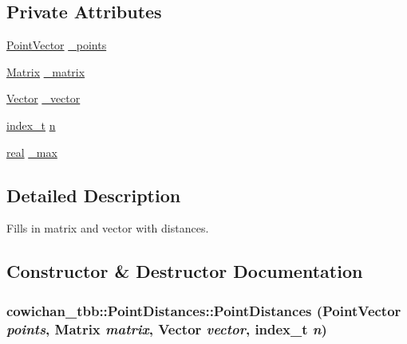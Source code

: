 \subsection*{Private Attributes}
\begin{CompactItemize}
\item 
\hyperlink{class_point}{PointVector} \hyperlink{classcowichan__tbb_1_1_point_distances_98528a38b93f367d6f5da78d4efb7fa7}{\_\-points}
\item 
\hyperlink{cowichan_8hpp_3fb46f939e55c239fbc95656fc0f3399}{Matrix} \hyperlink{classcowichan__tbb_1_1_point_distances_2f52c8fa9b61e6baf83ff17afd01cc14}{\_\-matrix}
\item 
\hyperlink{cowichan_8hpp_02bc1553e241b9b33408482658b3c355}{Vector} \hyperlink{classcowichan__tbb_1_1_point_distances_c125f8f4d3dc01725c1809c9766d0948}{\_\-vector}
\item 
\hyperlink{cowichan_8hpp_5b04577d5d21124855deaad298595371}{index\_\-t} \hyperlink{classcowichan__tbb_1_1_point_distances_623f4224db7a141a9f376e8c5bc51b03}{n}
\item 
\hyperlink{cowichan_8hpp_4d521b2c54a1f6312cc8fa04827eaf98}{real} \hyperlink{classcowichan__tbb_1_1_point_distances_e765ab87c711d42e65fe9a5558e2b5e2}{\_\-max}
\end{CompactItemize}


\subsection{Detailed Description}
Fills in matrix and vector with distances. 

\subsection{Constructor \& Destructor Documentation}
\hypertarget{classcowichan__tbb_1_1_point_distances_2c706157dc5644c83b2be957a3e73ee1}{
\subsubsection[{PointDistances}]{\setlength{\rightskip}{0pt plus 5cm}cowichan\_\-tbb::PointDistances::PointDistances ({\bf PointVector} {\em points}, \/  {\bf Matrix} {\em matrix}, \/  {\bf Vector} {\em vector}, \/  {\bf index\_\-t} {\em n})}}
\label{classcowichan__tbb_1_1_point_distances_2c706157dc5644c83b2be957a3e73ee1}


